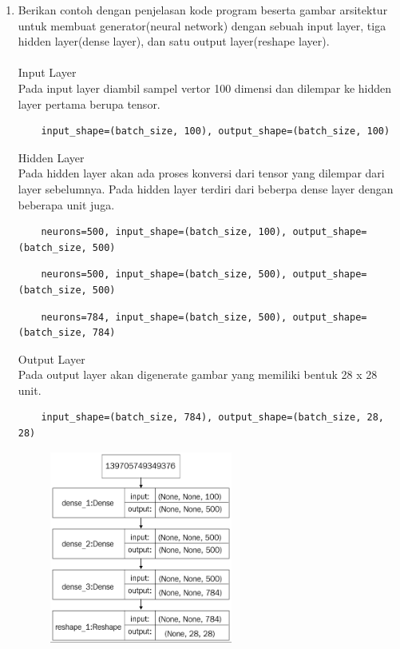 \begin{enumerate}
    
    \item Berikan contoh dengan penjelasan kode program beserta gambar arsitektur untuk membuat generator(neural network) dengan sebuah input layer, tiga hidden layer(dense layer), dan satu output layer(reshape layer).\\ \\
    Input Layer\\
    Pada input layer diambil sampel vertor 100 dimensi dan dilempar ke hidden layer pertama berupa tensor.\\
    \begin{lstlisting}
    input_shape=(batch_size, 100), output_shape=(batch_size, 100)
    \end{lstlisting}
    Hidden Layer\\
    Pada hidden layer akan ada proses konversi dari tensor yang dilempar dari layer sebelumnya. Pada hidden layer terdiri dari beberpa dense layer dengan beberapa unit juga.\\
    \begin{lstlisting}
    neurons=500, input_shape=(batch_size, 100), output_shape=(batch_size, 500)
    \end{lstlisting}
    \begin{lstlisting}
    neurons=500, input_shape=(batch_size, 500), output_shape=(batch_size, 500)
    \end{lstlisting}
    \begin{lstlisting}
    neurons=784, input_shape=(batch_size, 500), output_shape=(batch_size, 784)
    \end{lstlisting}
    Output Layer\\
    Pada output layer akan digenerate gambar yang memiliki bentuk 28 x 28 unit.\\
    \begin{lstlisting}
    input_shape=(batch_size, 784), output_shape=(batch_size, 28, 28)
    \end{lstlisting}
    \begin{figure}[H]
    	\includegraphics[width=6cm]{figures/1174006/chapter8/teori/arc.png}

\end{figure}
\end{enumerate}
